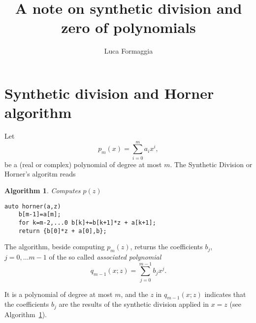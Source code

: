 \documentclass[10pt,a4paper]{article}
\author{Luca Formaggia}
\title{A note on synthetic division and zero of polynomials}
\theoremstyle{definition}%
\newtheorem{algo}{Algorithm}
\begin{document}
 
 \maketitle
 \section{Synthetic division and Horner algorithm}
 Let
 \[
 p_m(x)=\sum_{i=0}^{m} a_i x^i,
 \]
be a (real or complex) polynomial of degree at most $m$. The Synthetic Division or Horner's algoritm reads

\begin{algo}\label{alg:horner}
\emph{Computes $p(z)$}
\begin{lstlisting}
auto horner(a,z)
    b[m-1]=a[m];
    for k=m-2,...0 b[k]+=b[k+1]*z + a[k+1]; 
    return {b[0]*z + a[0],b}; 
\end{lstlisting}
\end{algo}
The algorithm, beside computing $p_m(z)$, returns the coefficients $b_j$, $j=0,\ldots m-1$ of the so called \emph{associated polynomial}
\begin{equation}
\label{eq:associated}
q_{m-1}(x;z)=\sum_{j=0}^{m-1}b_j x^j.
\end{equation}

It is a polynomial of degree at most $m$, and the $z$ in $q_{m-1}(x;z)$ indicates that the coefficients $b_j$ are the results of the synthetic division applied in $x=z$ (see Algorithm~\ref{alg:horner}). 
\end{document}

